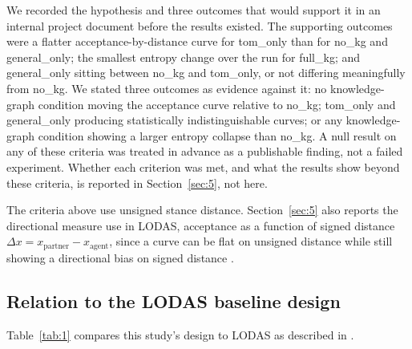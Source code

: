\documentclass[11pt,a4paper]{article}
\newcommand{\cond}[1]{\textsf{#1}}
\begin{document}
We recorded the hypothesis and three outcomes that would support it in an internal project document before the results existed. The supporting outcomes were a flatter acceptance-by-distance curve for \cond{tom\_only} than for \cond{no\_kg} and \cond{general\_only}; the smallest entropy change over the run for \cond{full\_kg}; and \cond{general\_only} sitting between \cond{no\_kg} and \cond{tom\_only}, or not differing meaningfully from \cond{no\_kg}. We stated three outcomes as evidence against it: no knowledge-graph condition moving the acceptance curve relative to \cond{no\_kg}; \cond{tom\_only} and \cond{general\_only} producing statistically indistinguishable curves; or any knowledge-graph condition showing a larger entropy collapse than \cond{no\_kg}. A null result on any of these criteria was treated in advance as a publishable finding, not a failed experiment. Whether each criterion was met, and what the results show beyond these criteria, is reported in Section~\ref{sec:5}, not here.

The criteria above use unsigned stance distance. Section~\ref{sec:5} also reports the directional measure \citet{cau2025selective} use in LODAS, acceptance as a function of signed distance $\Delta x = x_{\mathrm{partner}} - x_{\mathrm{agent}}$, since a curve can be flat on unsigned distance while still showing a directional bias on signed distance \citep{cau2025selective}.

\subsection{Relation to the LODAS baseline design}\label{sec:4.3}

Table~\ref{tab:1} compares this study's design to LODAS as described in \citet{cau2025selective} \citep{cau2025selective}.
\end{document}
